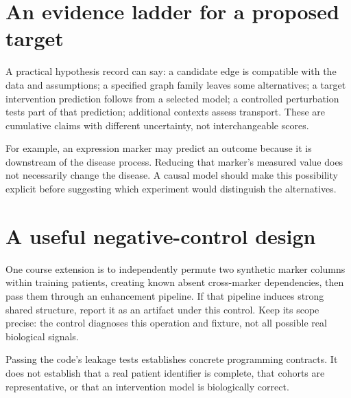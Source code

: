\documentclass[11pt,oneside]{scrbook}
\begin{document}
\section{An evidence ladder for a proposed target}
A practical hypothesis record can say: a candidate edge is compatible with the data
and assumptions; a specified graph family leaves some alternatives; a target intervention
prediction follows from a selected model; a controlled perturbation tests part of that
prediction; additional contexts assess transport. These are cumulative claims with
different uncertainty, not interchangeable scores.

For example, an expression marker may predict an outcome because it is downstream of
the disease process. Reducing that marker's measured value does not necessarily change
the disease. A causal model should make this possibility explicit before suggesting
which experiment would distinguish the alternatives.

\section{A useful negative-control design}
One course extension is to independently permute two synthetic marker columns within
training patients, creating known absent cross-marker dependencies, then pass them through
an enhancement pipeline. If that pipeline induces strong shared structure, report it as
an artifact under this control. Keep its scope precise: the control diagnoses this
operation and fixture, not all possible real biological signals.

\begin{pitfall}
Passing the code's leakage tests establishes concrete programming contracts. It does
not establish that a real patient identifier is complete, that cohorts are representative,
or that an intervention model is biologically correct.
\end{pitfall}
\end{document}
